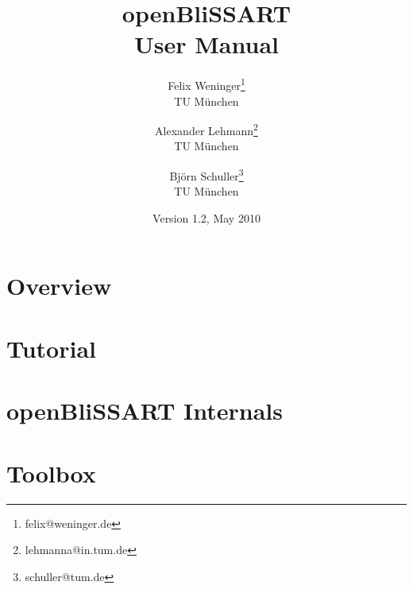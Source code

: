 \documentclass[a4paper,11pt]{book}
\author{
    Felix Weninger\thanks{felix@weninger.de}\\TU M\"unchen
    \and Alexander Lehmann\thanks{lehmanna@in.tum.de}\\TU M\"unchen
    \and Bj\"orn Schuller\thanks{schuller@tum.de}\\TU M\"unchen
}
\date{Version 1.2, May 2010}
\title{
    openBliSSART\\[0.5cm]
    User Manual
}
\begin{document}
\maketitle


\newpage


\tableofcontents




\chapter{Overview}
\label{chapter:Overview}





\chapter{Tutorial}
\label{chapter:Tutorial}





\chapter{openBliSSART Internals}
\label{chapter:RefManual}



\chapter{Toolbox}
\label{chapter:Toolbox}



\clearpage




\end{document}
